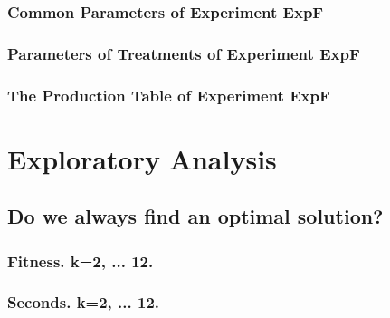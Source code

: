 \documentclass[18pt,c]{beamer}
\makeatletter
\let\beamer@writeslidentry@miniframeson=\beamer@writeslidentry
\newcommand*{\miniframeson}{\let\beamer@writeslidentry=\beamer@writeslidentry@miniframeson}
\makeatother
\begin{document}
 \begin{frame}
 \fontsize{8pt}{9pt}\selectfont
 \frametitle{ Common Parameters of Experiment ExpF }

 \label{ExpFCommonTable001.tex}  
 \end{frame}

 \begin{frame}
 \fontsize{8pt}{9pt}\selectfont
 \frametitle{ Parameters of Treatments of Experiment ExpF }

 \label{ExpFDifferentTable000.tex}  
 \end{frame}

 \begin{frame}
 \fontsize{8pt}{9pt}\selectfont
 \frametitle{ The Production Table of Experiment ExpF }

 \label{ExpFGrammarTable000.tex}  
 \end{frame}

\miniframeson
\section{Exploratory Analysis}
\miniframeson
\subsection{Do we always find an optimal solution?}
 \begin{frame}
 \fontsize{8pt}{9pt}\selectfont
 \frametitle{ Fitness. k=2, ... 12. }

 \label{ExpFStatsTable000.tex}  
 \end{frame}

 \begin{frame}
 \fontsize{8pt}{9pt}\selectfont
 \frametitle{ Seconds. k=2, ... 12. }

 \label{ExpFStatsTable001.tex}  
 \end{frame}
\end{document}
